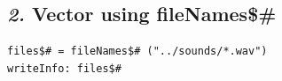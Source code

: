 \documentclass[12pt, english]{article}
\begin{document}
\subsection*{\emph{2.} Vector using fileNames\$\#}

\begin{lstlisting}
files$# = fileNames$# ("../sounds/*.wav")
writeInfo: files$#
\end{lstlisting}


\end{document}
